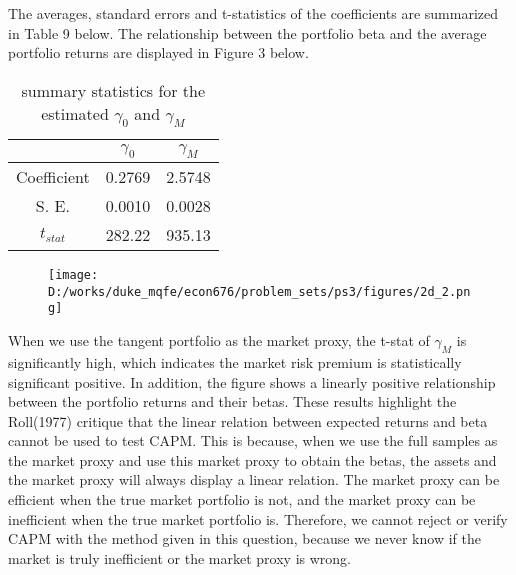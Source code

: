 
The averages, standard errors and t-statistics of the coefficients are summarized in Table 9 below. The relationship between the portfolio beta and the average portfolio returns are displayed in Figure 3 below.

\begin{table}[ht]
\centering
\caption{summary statistics for the estimated $\gamma_0$ and $\gamma_M$}
\begin{tabular}{c | c | c}
		& $\gamma_0$	& $\gamma_M$	\\	[0.5ex] 	\hline
Coefficient	& 0.2769 		& 2.5748		\\
S. E.		& 0.0010		& 0.0028		\\
$t_{stat}$	& 282.22 		& 935.13		\\ 	[0.5ex]	\hline \hline
\end{tabular}
\end{table}

\begin{figure}[h]
	\centering
	\caption{ }
	\texttt{[image: D:/works/duke\_mqfe/econ676/problem\_sets/ps3/figures/2d\_2.png]}
\end{figure}

When we use the tangent portfolio as the market proxy, the t-stat of $\gamma_M$ is significantly high, which indicates the market risk premium is statistically significant positive. In addition, the figure shows a linearly positive relationship between the portfolio returns and their betas. These results highlight the Roll(1977) critique that the linear relation between expected returns and beta cannot be used to test CAPM. This is because, when we use the full samples as the market proxy and use this market proxy to obtain the betas, the assets and the market proxy will always display a linear relation. The market proxy can be efficient when the true market portfolio is not, and the market proxy can be inefficient when the true market portfolio is. Therefore, we cannot reject or verify CAPM with the method given in this question, because we never know if the market is truly inefficient or the market proxy is wrong.